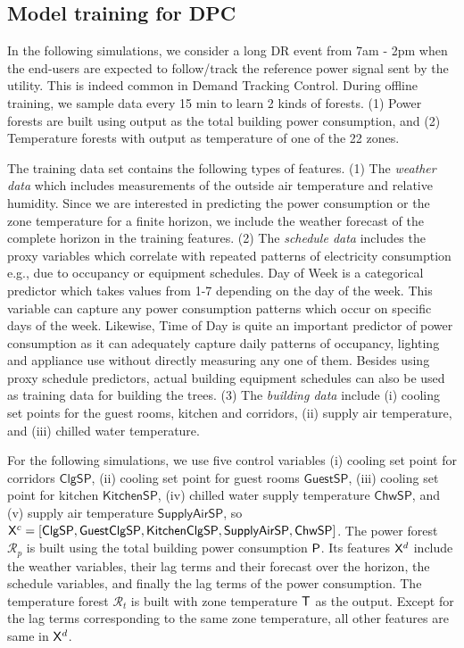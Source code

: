 \subsection{Model training for DPC}

In the following simulations, we consider a long DR event from 7am - 2pm when the end-users are expected to follow/track the reference power signal sent by the utility. This is indeed common in Demand Tracking Control. 
During offline training, we sample data every 15 min to learn 2 kinds of forests. (1) Power forests are built using output as the total building power consumption, and (2) Temperature forests with output as temperature of one of the 22 zones. 

The training data set contains the following types of features. (1) The \textit{weather data} which includes measurements of the outside air temperature and relative humidity. Since we are interested in predicting the power consumption or the zone temperature for a finite horizon, we include the weather forecast of the complete horizon in the training features. (2) The \textit{schedule data} includes the proxy variables which correlate with repeated patterns of electricity consumption e.g., due to occupancy or equipment schedules. Day of Week is a categorical predictor which takes values from 1-7 depending on the day of the week. This variable can capture any power consumption patterns which occur on specific days of the week. Likewise, Time of Day is quite an important predictor of power consumption as it can adequately capture daily patterns of occupancy, lighting and appliance use without directly measuring any one of them. Besides using proxy schedule predictors, actual building equipment schedules can also be used as training data for building the trees. (3) The \textit{building data} include (i) cooling set points for  the guest rooms, kitchen and corridors, (ii) supply air temperature, and (iii) chilled water temperature.

For the following simulations, we use five control variables (i) cooling set point for corridors $\mathsf{ClgSP}$, (ii) cooling set point for guest rooms $\mathsf{GuestSP}$, (iii) cooling set point for kitchen $\mathsf{KitchenSP}$, (iv) chilled water supply temperature $\mathsf{ChwSP}$, and (v) supply air temperature  $\mathsf{SupplyAirSP}$, so $\mathsf{X}^c = [\mathsf{ClgSP},\mathsf{GuestClgSP},\\\mathsf{KitchenClgSP},\mathsf{SupplyAirSP}, \mathsf{ChwSP}]$. 
The power forest $\mathcal{R}_p$ is built using the total building power consumption $\mathsf{P}$. Its features $\mathsf{X}^d$ include the weather variables, their lag terms and their forecast over the horizon, the schedule variables, and finally the lag terms of the power consumption.
The temperature forest $\mathcal{R}_t$ is built with zone temperature $\mathsf{T}$ as the output. Except for the lag terms corresponding to the same zone temperature, all other features are same in $\mathsf{X}^d$.

